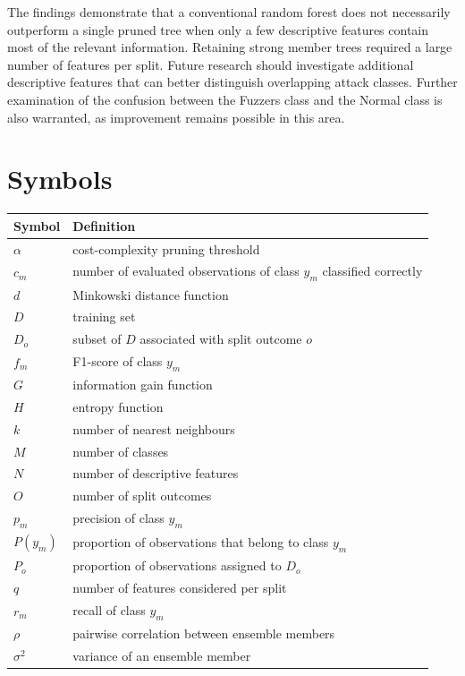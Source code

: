 \documentclass[conference]{IEEEtran}
\begin{document}
The findings demonstrate that a conventional random forest does not necessarily outperform a single pruned tree when only a few descriptive features contain most of the relevant information. Retaining strong member trees required a large number of features per split. Future research should investigate additional descriptive features that can better distinguish overlapping attack classes. Further examination of the confusion between the Fuzzers class and the Normal class is also warranted, as improvement remains possible in this area.

\appendices

\section{Symbols}

\begin{center}
\footnotesize
\begin{tabular}{@{}lp{}@{}}
\toprule
Symbol & Definition \\
\midrule
$\alpha$ & cost-complexity pruning threshold \\
$c_m$ & number of evaluated observations of class $y_m$ classified correctly \\
$d$ & Minkowski distance function \\
$D$ & training set \\
$D_o$ & subset of $D$ associated with split outcome $o$ \\
$f_m$ & F1-score of class $y_m$ \\
$G$ & information gain function \\
$H$ & entropy function \\
$k$ & number of nearest neighbours \\
$M$ & number of classes \\
$N$ & number of descriptive features \\
$O$ & number of split outcomes \\
$p_m$ & precision of class $y_m$ \\
$P(y_m)$ & proportion of observations that belong to class $y_m$ \\
$P_o$ & proportion of observations assigned to $D_o$ \\
$q$ & number of features considered per split \\
$r_m$ & recall of class $y_m$ \\
$\rho$ & pairwise correlation between ensemble members \\
$\sigma^2$ & variance of an ensemble member \\

\end{tabular}
\end{center}
\end{document}
